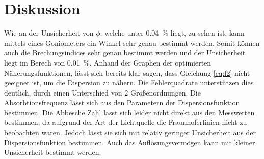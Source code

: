 \section{Diskussion}
\label{sec:Diskussion}
Wie an der Unsicherheit von $\phi$, welche unter \SI{0.04}{\percent} liegt, zu sehen ist, kann mittels eines Goniometers ein Winkel sehr genau bestimmt werden.
Somit können auch die Brechungsindices sehr genau bestimmt werden und der Unsicherheit liegt im Berech von \SI{0.01}{\percent}.
Anhand der Graphen der optimierten Näherungsfunktionen, lässt sich bereits klar sagen, dass Gleichung \eqref{eq:f2} nicht geeignet ist, um die Dispersion zu nähern.
Die Fehlerquadrate unterstützen dies deutlich, durch einen Unterschied von $\num{2}$ Größenordnungen.
Die Absorbtionsfrequenz lässt sich aus den Parametern der Dispersionsfunktion bestimmen. 
Die Abbesche Zahl lässt sich leider nicht direkt aus den Messwerten bestimmen, da aufgrund der Art der Lichtquelle die Fraunhoferlinien nicht zu beobachten waren.
Jedoch lässt sie sich mit relativ geringer Unsicherheit aus der Dispersionsfunktion bestimmen.
Auch das Auflösungsvermögen kann mit kleiner Unsicherheit bestimmt werden.
